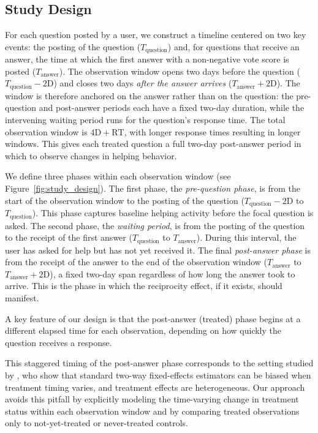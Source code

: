 \subsection{Study Design}
\label{sec:study_design}

For each question posted by a user, we construct a timeline centered on two key events: the posting of the question ($T_{\text{question}}$) and, for questions that receive an answer, the time at which the first answer with a non-negative vote score is posted ($T_{\text{answer}}$). The observation window opens two days before the question ($T_{\text{question}} - 2\text{D}$) and closes two days \emph{after the answer arrives} ($T_{\text{answer}} + 2\text{D}$). The window is therefore anchored on the answer rather than on the question: the pre-question and post-answer periods each have a fixed two-day duration, while the intervening waiting period runs for the question's response time. The total observation window is $4\text{D}+\text{RT}$, with longer response times resulting in longer windows. This gives each treated question a full two-day post-answer period in which to observe changes in helping behavior.

We define three phases within each observation window (see Figure~\ref{fig:study_design}). The first phase, the \textit{pre-question phase}, is from the start of the observation window to the posting of the question ($T_{\text{question}} - 2\text{D}$ to $T_{\text{question}}$). This phase captures baseline helping activity before the focal question is asked.
The second phase, the \textit{waiting period}, is from the posting of the question to the receipt of the first answer ($T_{\text{question}}$ to $T_{\text{answer}}$). During this interval, the user has asked for help but has not yet received it. 
The final \textit{post-answer phase} is from the receipt of the answer to the end of the observation window ($T_{\text{answer}}$ to $T_{\text{answer}} + 2\text{D}$), a fixed two-day span regardless of how long the answer took to arrive. This is the phase in which the reciprocity effect, if it exists, should manifest.

A key feature of our design is that the post-answer (treated) phase begins at a different elapsed time for each observation, depending on how quickly the question receives a response.

This staggered timing of the post-answer phase corresponds to the setting studied by \citet{callaway_santanna_2021}, who show that standard two-way fixed-effects estimators can be biased when treatment timing varies, and treatment effects are heterogeneous. Our approach avoids this pitfall by explicitly modeling the time-varying change in treatment status within each observation window and by comparing treated observations only to not-yet-treated or never-treated controls.

